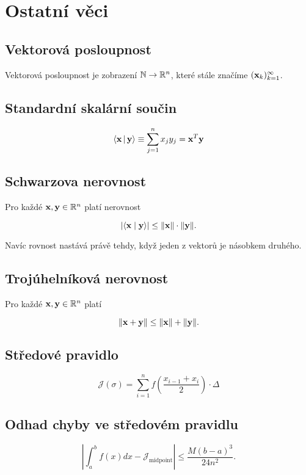\section{Ostatní věci}

\subsection*{Vektorová posloupnost}

Vektorová posloupnost je zobrazení $\mathbb{N} \to \mathbb{R}^n$, které stále značíme
$(\mathbf{x}_k)_{k=1}^\infty$.

\subsection*{Standardní skalární součin}

\[ \langle \mathbf{x} \,|\, \mathbf{y} \rangle \equiv \sum_{j=1}^n x_j y_j = \mathbf{x}^T \mathbf{y}\]

\subsection*{Schwarzova nerovnost}

Pro každé $\mathbf{x},\mathbf{y}\in\mathbb{R}^n$ platí nerovnost

\[ |\langle \mathbf{x} \mid \mathbf{y} \rangle| \leq \|\mathbf{x}\| \cdot \|\mathbf{y}\|. \]

\noindent Navíc rovnost nastává právě tehdy, když jeden z vektorů je násobkem druhého.

\subsection*{Trojúhelníková nerovnost}

Pro každé $\mathbf{x},\mathbf{y}\in\mathbb{R}^n$ platí

\[ \|\mathbf{x} + \mathbf{y}\| \leq \|\mathbf{x}\| + \|\mathbf{y}\|. \]

\subsection*{Středové pravidlo}

\[ \mathcal{J}(\sigma) = \sum_{i = 1}^n f \left( \frac{x_{i-1}+x_i}{2} \right) \cdot \Delta \]

\subsection*{Odhad chyby ve středovém pravidlu}

\[ \left|\int^b_a f(x) dx - \mathcal{J}_{\mathrm{midpoint}}\right| \leq \frac{M (b-a)^3}{24 n^2}. \]

